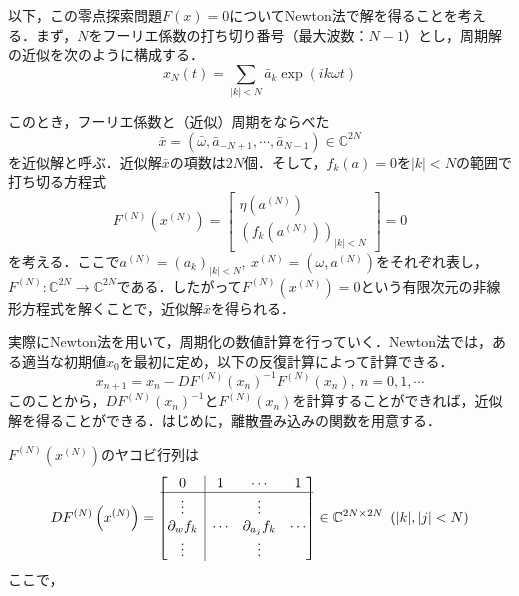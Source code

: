 以下，この零点探索問題$F(x)=0$についてNewton法で解を得ることを考える．まず，$N$をフーリエ係数の打ち切り番号（最大波数：$N-1$）とし，周期解の近似を次のように構成する．
\begin{equation*}
  x_N(t) = \sum_{|k|<N} \bar{a}_k \exp(ik\omega t)
\end{equation*}

このとき，フーリエ係数と（近似）周期をならべた
\begin{equation*}
  \bar{x} = \left(\bar{\omega},\bar{a}_{-N+1},\cdots,\bar{a}_{N-1}\right) \in \mathbb{C}^{2N}
\end{equation*}
を近似解と呼ぶ．近似解$\bar{x}$の項数は$2N$個．そして，$f_k(a)=0$を$|k|<N$の範囲で打ち切る方程式
\begin{equation*}
  F^{(N)}\left(x^{(N)}\right) = \begin{bmatrix}
    \eta\left(a^{(N)}\right) \\
    \left(f_k(a^{(N)})\right)_{|k|<N}
  \end{bmatrix}
  = 0
\end{equation*}
を考える．ここで$a^{(N)}=\left(a_k\right)_{|k|<N},\ x^{(N)}=\left(\omega, a^{(N)}\right)$をそれぞれ表し，$F^{(N)}:\mathbb{C}^{2N}\rightarrow\mathbb{C}^{2N}$である．したがって$F^{(N)}\left(x^{(N)}\right)=0$という有限次元の非線形方程式を解くことで，近似解$\bar{x}$を得られる．

実際にNewton法を用いて，周期化の数値計算を行っていく．Newton法では，ある適当な初期値$x_0$を最初に定め，以下の反復計算によって計算できる．
\begin{equation*}
  x_{n+1} = x_n - DF^{(N)}\left(x_n\right)^{-1} F^{(N)}\left(x_n\right),\ n=0,1,\cdots
\end{equation*}
このことから，$DF^{(N)}\left(x_n\right)^{-1}$と$F^{(N)}\left(x_n\right)$を計算することができれば，近似解を得ることができる．はじめに，離散畳み込みの関数を用意する．

$F^{(N)}(x^{(N)})$のヤコビ行列は
\begin{equation*}
  DF^{(N)}\left(x^{(N)}\right)=\begin{bmatrix}
    \multicolumn{1}{c|}{0}              & 1      & \cdots            & 1      \\ \hline
    \multicolumn{1}{c|}{\vdots}         &        & \vdots            &        \\
    \multicolumn{1}{c|}{\partial_w f_k} & \cdots & \partial_{a_j}f_k & \cdots \\
    \multicolumn{1}{c|}{\vdots}         &        & \vdots            &        \\
  \end{bmatrix} \in \mathbb{C}^{2N\times 2N}\ \left(|k|,|j|<N\right)
\end{equation*}
ここで，

